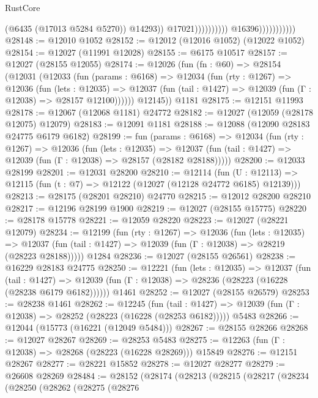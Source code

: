 \begin{lexlean}{RustCore}
\begin{coremodule}
                                                  (@6435 (@17013 @5284 @5270))
                                                  @14293))
                                              @17021))))))))))
                          @16396)))))))))))
@28148 := @12010 @1052
@28152 := @12012 (@12016 @1052) (@12022 @1052)
@28154 := @12027 (@11991 @12028)
@28155 := @6175 @10517
@28157 := @12027 (@28155 @12055)
@28174 := @12026
    (fun (fn : @60) =>
    @28154
      (@12031
        (@12033
          (fun (params : @6168) =>
          @12034
            (fun (rty : @1267) =>
            @12036
              (fun (lets : @12035) =>
              @12037 (fun (tail : @1427) => @12039 (fun (Γ : @12038) => @28157 @12100))))))
        @12145))
    @1181
@28175 := @12151 @11993
@28178 := @12067 (@12068 @1181) @24772
@28182 := @12027 (@12059 (@28178 @12075) @12079)
@28183 := @12091 @1181
@28188 := @12088 (@12090 @28183 @24775 @6179 @6182)
@28199 := fun (params : @6168) =>
  @12034
    (fun (rty : @1267) =>
    @12036
      (fun (lets : @12035) =>
      @12037 (fun (tail : @1427) => @12039 (fun (Γ : @12038) => @28157 (@28182 @28188)))))
@28200 := @12033 @28199
@28201 := @12031 @28200
@28210 := @12114
    (fun (U : @12113) => @12115 (fun (t : @7) => @12122 (@12027 (@12128 @24772 @6185) @12139)))
@28213 := @28175 (@28201 @28210) @24770
@28215 := @12012 @28200 @28210
@28217 := @12196 @28199 @1900
@28219 := @12027 (@28155 @15775)
@28220 := @28178 @15778
@28221 := @12059 @28220
@28223 := @12027 (@28221 @12079)
@28234 := @12199
    (fun (rty : @1267) =>
    @12036
      (fun (lets : @12035) =>
      @12037 (fun (tail : @1427) => @12039 (fun (Γ : @12038) => @28219 (@28223 @28188)))))
    @1284
@28236 := @12027 (@28155 @26561)
@28238 := @16229 @28183 @24775
@28250 := @12221
    (fun (lets : @12035) =>
    @12037
      (fun (tail : @1427) =>
      @12039 (fun (Γ : @12038) => @28236 (@28223 (@16228 (@28238 @6179 @6182))))))
    @1461
@28252 := @12027 (@28155 @26579)
@28253 := @28238 @1461
@28262 := @12245
    (fun (tail : @1427) => @12039 (fun (Γ : @12038) => @28252 (@28223 (@16228 (@28253 @6182)))))
    @5483
@28266 := @12044 (@15773 (@16221 (@12049 @5484)))
@28267 := @28155 @28266
@28268 := @12027 @28267
@28269 := @28253 @5483
@28275 := @12263 (fun (Γ : @12038) => @28268 (@28223 (@16228 @28269))) @15849
@28276 := @12151 @28267
@28277 := @28221 @15852
@28278 := @12027 @28277
@28279 := @26608 @28269
@28484 := @28152
    (@28174
      (@28213
        (@28215
          (@28217
            (@28234
              (@28250
                (@28262
                  (@28275
                    (@28276

\end{coremodule}
\end{lexlean}
